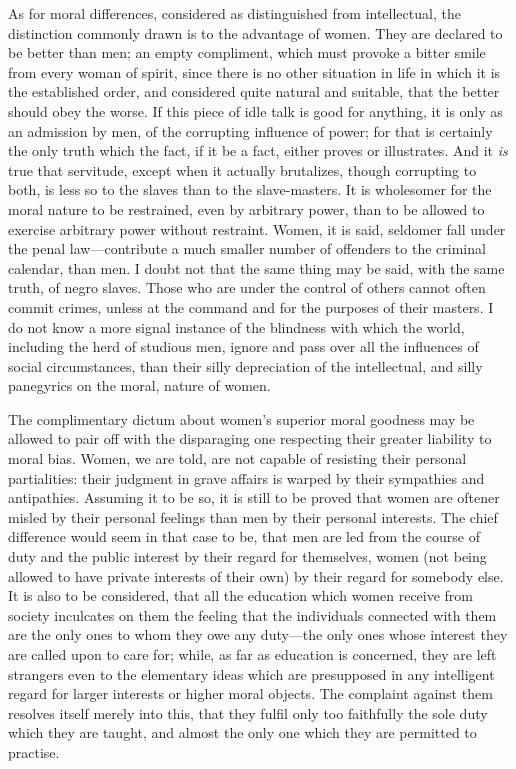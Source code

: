 \documentclass[12pt]{report}
\begin{document}
As for moral differences, considered as distinguished from intellectual, the distinction commonly drawn is to the advantage of women. They are declared to be better than men; an empty compliment, which must provoke a bitter smile from every woman of spirit, since there is no other situation in life in which it is the established order, and considered quite natural and suitable, that the better should obey the worse. If this piece of idle talk is good for anything, it is only as an admission by men, of the corrupting influence of power; for that is certainly the only truth which the fact, if it be a fact, either proves or illustrates. And it \emph{is} true that servitude, except when it actually brutalizes, though corrupting to both, is less so to the slaves than to the slave-masters. It is wholesomer for the moral nature to be restrained, even by arbitrary power, than to be allowed to exercise arbitrary power without restraint. Women, it is said, seldomer fall under the penal law—contribute a much smaller number of offenders to the criminal calendar, than men. I doubt not that the same thing may be said, with the same truth, of negro slaves. Those who are under the control of others cannot often commit crimes, unless at the command and for the purposes of their masters. I do not know a more signal instance of the blindness with which the world, including the herd of studious men, ignore and pass over all the influences of social circumstances, than their silly depreciation of the intellectual, and silly panegyrics on the moral, nature of women.

The complimentary dictum about women's superior moral goodness may be allowed to pair off with the disparaging one respecting their greater liability to moral bias. Women, we are told, are not capable of resisting their personal partialities: their judgment in grave affairs is warped by their sympathies and antipathies. Assuming it to be so, it is still to be proved that women are oftener misled by their personal feelings than men by their personal interests. The chief difference would seem in that case to be, that men are led from the course of duty and the public interest by their regard for themselves, women (not being allowed to have private interests of their own) by their regard for somebody else. It is also to be considered, that all the education which women receive from society inculcates on them the feeling that the individuals connected with them are the only ones to whom they owe any duty—the only ones whose interest they are called upon to care for; while, as far as education is concerned, they are left strangers even to the elementary ideas which are presupposed in any intelligent regard for larger interests or higher moral objects. The complaint against them resolves itself merely into this, that they fulfil only too faithfully the sole duty which they are taught, and almost the only one which they are permitted to practise.
\end{document}
